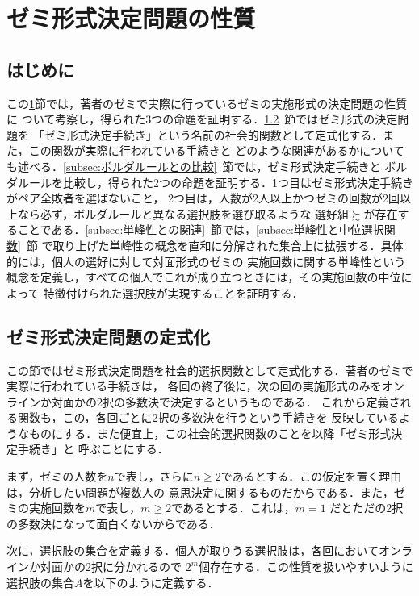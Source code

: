 \documentclass[dvipdfmx]{jsarticle}
\begin{document}
\section{ゼミ形式決定問題の性質}\label{sec:ゼミ形式決定問題の性質}
\subsection{はじめに}
この\ref{sec:ゼミ形式決定問題の性質}節では，著者のゼミで実際に行っているゼミの実施形式の決定問題の性質に
ついて考察し，得られた3つの命題を証明する．\ref{subsec:ゼミ形式決定問題の定式化}~節ではゼミ形式の決定問題を
「ゼミ形式決定手続き」という名前の社会的関数として定式化する．また，この関数が実際に行われている手続きと
どのような関連があるかについても述べる．\ref{subsec:ボルダルールとの比較}~節では，ゼミ形式決定手続きと
ボルダルールを比較し，得られた2つの命題を証明する．1つ目はゼミ形式決定手続きがペア全敗者を選ばないこと，
2つ目は，人数が2人以上かつゼミの回数が2回以上なら必ず，ボルダルールと異なる選択肢を選び取るような
選好組$\succsim$が存在することである．\ref{subsec:単峰性との関連}~節では，\ref{subsec:単峰性と中位選択関数}~節
で取り上げた単峰性の概念を直和に分解された集合上に拡張する．具体的には，個人の選好に対して対面形式のゼミの
実施回数に関する単峰性という概念を定義し，すべての個人でこれが成り立つときには，その実施回数の中位によって
特徴付けられた選択肢が実現することを証明する．


\subsection{ゼミ形式決定問題の定式化}\label{subsec:ゼミ形式決定問題の定式化}
この節ではゼミ形式決定問題を社会的選択関数として定式化する．著者のゼミで実際に行われている手続きは，
各回の終了後に，次の回の実施形式のみをオンラインか対面かの2択の多数決で決定するというものである．
これから定義される関数も，この，各回ごとに2択の多数決を行うという手続きを
反映しているようなものにする．また便宜上，この社会的選択関数のことを以降「ゼミ形式決定手続き」と
呼ぶことにする．

まず，ゼミの人数を$n$で表し，さらに$n \geq 2$であるとする．この仮定を置く理由は，分析したい問題が複数人の
意思決定に関するものだからである．また，ゼミの実施回数を$m$で表し，$m \geq 2$であるとする．これは，$m=1$
だとただの2択の多数決になって面白くないからである．

次に，選択肢の集合を定義する．個人が取りうる選択肢は，各回においてオンラインか対面かの2択に分かれるので
$2^m$個存在する．この性質を扱いやすいように選択肢の集合$A$を以下のように定義する．
\end{document}
